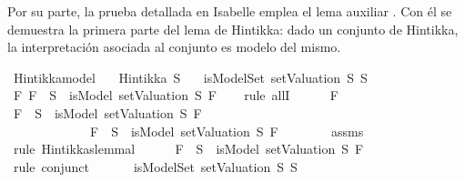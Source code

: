 \begin{isabellebody}
\begin{isamarkuptext}
  Por su parte, la prueba detallada en Isabelle emplea el lema
  auxiliar . Con él se demuestra la primera parte del 
  lema de Hintikka: dado un conjunto de Hintikka, la interpretación 
  asociada al conjunto es modelo del mismo.%
\end{isamarkuptext}\isamarkuptrue%
\isamarkupfalse%
\ Hintikka{\isacharunderscore}model{\isacharcolon}\isanewline
\ \ \ {\isachardoublequoteopen}Hintikka\ S{\isachardoublequoteclose}\isanewline
\ \ \ {\isachardoublequoteopen}isModelSet\ {\isacharparenleft}setValuation\ S{\isacharparenright}\ S{\isachardoublequoteclose}\isanewline
%
\isadelimproof
%
\endisadelimproof
%
\isatagproof
{}\isamarkupfalse%
\ {\isacharminus}\isanewline
\ \ \isamarkupfalse%
\ {\isachardoublequoteopen}{\isasymforall}F{\isachardot}\ {\isacharparenleft}F\ {\isasymin}\ S\ {\isasymlongrightarrow}\ isModel\ {\isacharparenleft}setValuation\ S{\isacharparenright}\ F{\isacharparenright}{\isachardoublequoteclose}\isanewline
\ \ \isamarkupfalse%
\ {\isacharparenleft}rule\ allI{\isacharparenright}\isanewline
\ \ \ \ \isamarkupfalse%
\ F\isanewline
\ \ \ \ \isamarkupfalse%
\ {\isachardoublequoteopen}{\isacharparenleft}F\ {\isasymin}\ S\ {\isasymlongrightarrow}\ isModel\ {\isacharparenleft}setValuation\ S{\isacharparenright}\ F{\isacharparenright}\isanewline
\ \ \ \ \ \ \ \ \ \ \ {\isasymand}\ {\isacharparenleft}\isactrlbold {\isasymnot}\ F\ {\isasymin}\ S\ {\isasymlongrightarrow}\ {\isacharparenleft}{\isasymnot}{\isacharparenleft}isModel\ {\isacharparenleft}setValuation\ S{\isacharparenright}\ F{\isacharparenright}{\isacharparenright}{\isacharparenright}{\isachardoublequoteclose}\isanewline
\ \ \ \ \ \ \isamarkupfalse%
\ assms\ \isamarkupfalse%
\ {\isacharparenleft}rule\ Hintikkas{\isacharunderscore}lemma{\isacharunderscore}l{}{\isacharparenright}\isanewline
\ \ \ \ \isamarkupfalse%
\ {\isachardoublequoteopen}F\ {\isasymin}\ S\ {\isasymlongrightarrow}\ isModel\ {\isacharparenleft}setValuation\ S{\isacharparenright}\ F{\isachardoublequoteclose}\isanewline
\ \ \ \ \ \ \isamarkupfalse%
\ {\isacharparenleft}rule\ conjunct{}{\isacharparenright}\isanewline
\ \ \isamarkupfalse%
\isanewline
\ \ \isamarkupfalse%
\ {\isachardoublequoteopen}isModelSet\ {\isacharparenleft}setValuation\ S{\isacharparenright}\ S{\isachardoublequoteclose}\isanewline

\end{isabellebody}

